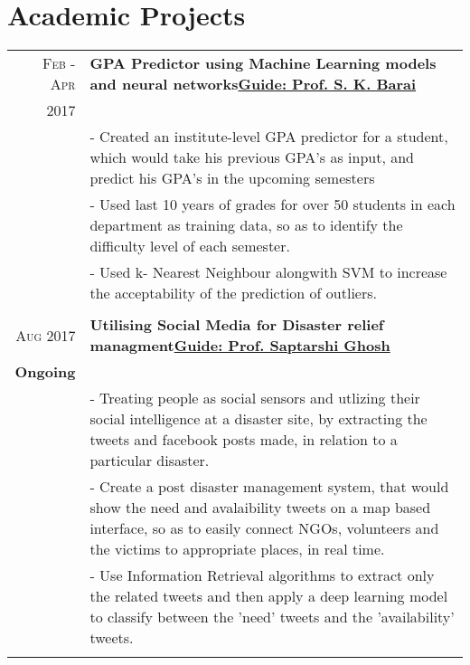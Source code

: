 \documentclass[a4paper,10pt]{extarticle} %
\begin{document}

\section{Academic Projects}

\begin{tabular}{r|p{18cm}}

\textsc{Feb - Apr} & \textbf{GPA Predictor using Machine Learning models and neural networks}\hfill\textbf{\href{http://www.facweb.iitkgp.ernet.in/~skbarai/}{Guide: Prof. S. K. Barai}}\\
\textsc{2017}\\
& \footnotesize{- Created an institute-level GPA predictor for a student, which would take his previous GPA's as input, and predict his GPA's in the upcoming semesters}\\
& \footnotesize{- Used last 10 years of grades for over 50 students in each department as training data, so as to identify the difficulty level of each semester.}\\
& \footnotesize{- Used	k- Nearest Neighbour alongwith SVM to increase the acceptability of the	prediction of outliers.}\\
\multicolumn{2}{c}{} \\
\textsc{Aug 2017} & \textbf{Utilising Social Media for Disaster relief managment}\hfill\textbf{\href{http://cse.iitkgp.ac.in/~sghosh/}{Guide: Prof. Saptarshi Ghosh}}\\
\textbf{Ongoing}\\
& \footnotesize{- Treating people as social sensors and utlizing their social intelligence at a disaster site, by extracting the tweets and facebook posts made, in relation to a particular disaster.}\\
& \footnotesize{- Create a post disaster management system, that would show the need and avalaibility tweets on a map based interface, so as to easily connect NGOs, volunteers and the victims to appropriate places, in real time.}\\
& \footnotesize{- Use Information Retrieval algorithms to extract only the related tweets and then apply a deep learning model to classify between the 'need' tweets and the 'availability' tweets.}\\
\multicolumn{2}{c}{} \\


\end{tabular}
\end{document}
